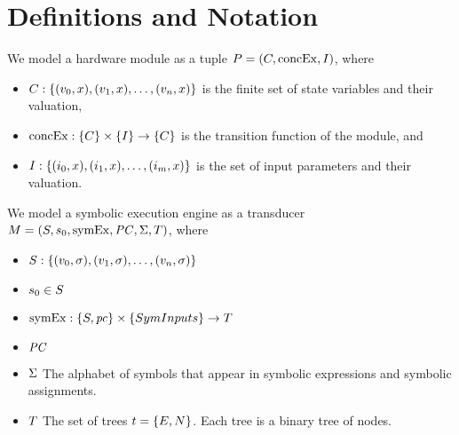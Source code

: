 \section{Definitions and Notation}


We model a hardware module as a tuple $P = (C,
\mathrm{concEx}, I)$, where
\begin{itemize}
\item $C: \{(v_0,x), (v_1,x), \ldots, (v_n,x)\}$ is the finite set of state variables and their valuation,
\item $\mathrm{concEx}: \{C\} \times \{I\} \rightarrow 
  \{C\}$ is the transition function of the module, and
\item $I: \{(i_0,x), (i_1,x),
  \ldots, (i_m,x)\}$ is the set of input parameters and their valuation.
\end{itemize}

We model a symbolic execution engine as a transducer $M =
(S, s_0, \mathrm{symEx}, \mathit{PC}, \Sigma,
T)$, where
\begin{itemize}
\item $S: \{(v_0,\sigma), (v_1,\sigma), \ldots, (v_n,\sigma)\}$
\item $s_0 \in S$
\item {} $\mathrm{symEx}: \{S,\mathit{pc}\}
  \times \{SymInputs\} \rightarrow T$
\item $\mathit{PC}$
\item $\Sigma$ The alphabet of symbols that appear in symbolic expressions
  and symbolic assignments.
\item $T$ The set of trees $t = \{E,N\}$. Each tree is a binary tree of nodes.
\end{itemize}


